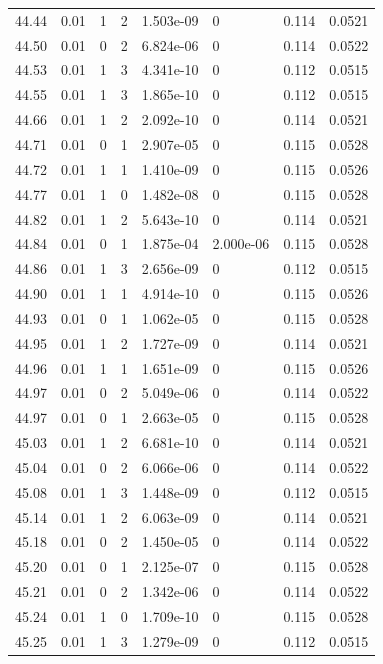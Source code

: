 \documentclass[preview]{standalone}
\begin{document}
{{{{{{{{{{{{{{{{{{{\begin{tabular}{L{1.2cm}C{1.2cm} C{0.3cm}C{0.5cm} C{1.4cm}C{1.4cm} C{1.4cm}C{1.4cm}}
  44.44  &  0.01  & 1     &  2 &  1.503e-09  & 0  & 0.114 &  0.0521   \\ 
  44.50  &  0.01  & 0     &  2 &  6.824e-06  & 0  & 0.114 &  0.0522   \\ 
  44.53  &  0.01  & 1     &  3 &  4.341e-10  & 0  & 0.112 &  0.0515   \\ 
  44.55  &  0.01  & 1     &  3 &  1.865e-10  & 0  & 0.112 &  0.0515   \\ 
  44.66  &  0.01  & 1     &  2 &  2.092e-10  & 0  & 0.114 &  0.0521   \\ 
  44.71  &  0.01  & 0     &  1 &  2.907e-05  & 0  & 0.115 &  0.0528   \\ 
  44.72  &  0.01  & 1     &  1 &  1.410e-09  & 0  & 0.115 &  0.0526   \\ 
  44.77  &  0.01  & 1     &  0 &  1.482e-08  & 0  & 0.115 &  0.0528   \\ 
  44.82  &  0.01  & 1     &  2 &  5.643e-10  & 0  & 0.114 &  0.0521   \\ 
  44.84  &  0.01  & 0     &  1 &  1.875e-04  & 2.000e-06  & 0.115 &  0.0528   \\ 
  44.86  &  0.01  & 1     &  3 &  2.656e-09  & 0  & 0.112 &  0.0515   \\ 
  44.90  &  0.01  & 1     &  1 &  4.914e-10  & 0  & 0.115 &  0.0526   \\ 
  44.93  &  0.01  & 0     &  1 &  1.062e-05  & 0  & 0.115 &  0.0528   \\ 
  44.95  &  0.01  & 1     &  2 &  1.727e-09  & 0  & 0.114 &  0.0521   \\ 
  44.96  &  0.01  & 1     &  1 &  1.651e-09  & 0  & 0.115 &  0.0526   \\ 
  44.97  &  0.01  & 0     &  2 &  5.049e-06  & 0  & 0.114 &  0.0522   \\ 
  44.97  &  0.01  & 0     &  1 &  2.663e-05  & 0  & 0.115 &  0.0528   \\ 
  45.03  &  0.01  & 1     &  2 &  6.681e-10  & 0  & 0.114 &  0.0521   \\ 
  45.04  &  0.01  & 0     &  2 &  6.066e-06  & 0  & 0.114 &  0.0522   \\ 
  45.08  &  0.01  & 1     &  3 &  1.448e-09  & 0  & 0.112 &  0.0515   \\ 
  45.14  &  0.01  & 1     &  2 &  6.063e-09  & 0  & 0.114 &  0.0521   \\ 
  45.18  &  0.01  & 0     &  2 &  1.450e-05  & 0  & 0.114 &  0.0522   \\ 
  45.20  &  0.01  & 0     &  1 &  2.125e-07  & 0  & 0.115 &  0.0528   \\ 
  45.21  &  0.01  & 0     &  2 &  1.342e-06  & 0  & 0.114 &  0.0522   \\ 
  45.24  &  0.01  & 1     &  0 &  1.709e-10  & 0  & 0.115 &  0.0528   \\ 
  45.25  &  0.01  & 1     &  3 &  1.279e-09  & 0  & 0.112 &  0.0515   \\ 
\hline 
\end{tabular} 

}}}}}}}}}}}}}}}}}}}
\end{document}
